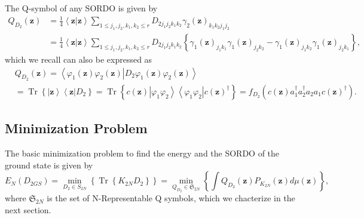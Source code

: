 \documentclass[aps,preprint]{revtex4}%
\begin{document}
The Q-symbol of any SORDO is given by
\begin{align}
Q_{D_{2}}\left(  \mathbf{z}\right)   &  =\frac{1}{4}\left\langle
\mathbf{z}\left\vert \mathbf{z}\right.  \right\rangle \sum_{1\leq j_{1}%
,j_{2},k_{1},k_{2}\leq r}D_{2j_{1}j_{2}k_{1}k_{2}}\gamma_{2}\left(
\mathbf{z}\right)  _{k_{1}k_{2}j_{1}j_{2}}\nonumber\\
&  =\frac{1}{4}\left\langle \mathbf{z}\left\vert \mathbf{z}\right.
\right\rangle \sum_{1\leq j_{1},j_{2},k_{1},k_{2}\leq r}D_{2j_{1}j_{2}%
k_{1}k_{2}}\left\{  \gamma_{1}\left(  \mathbf{z}\right)  _{j_{1}k_{1}}%
\gamma_{1}\left(  \mathbf{z}\right)  _{j_{2}k_{2}}-\gamma_{1}\left(
\mathbf{z}\right)  _{j_{1}k_{2}}\gamma_{1}\left(  \mathbf{z}\right)
_{j_{2}k_{1}}\right\}  ,
\end{align}
which we recall can also be expressed as
\begin{align}
&  Q_{D_{2}}\left(  \mathbf{z}\right)  =\left\langle \varphi_{1}\left(
\mathbf{z}\right)  \varphi_{2}\left(  \mathbf{z}\right)  \left\vert
D_{2}\varphi_{1}\left(  \mathbf{z}\right)  \varphi_{2}\left(  \mathbf{z}%
\right)  \right.  \right\rangle \nonumber\\
&  =\operatorname*{Tr}\left\{  \left\vert \mathbf{z}\right\rangle \left\langle
\mathbf{z}\right\vert D_{2}\right\}  =\operatorname*{Tr}\left\{  c\left(
\mathbf{z}\right)  \left\vert \varphi_{1}\varphi_{2}\right\rangle \left\langle
\varphi_{1}\varphi_{2}\right\vert c\left(  \mathbf{z}\right)  ^{\dagger
}\right\}  =f_{D_{2}}\left(  c\left(  \mathbf{z}\right)  a_{1}^{\dagger}%
a_{2}^{\dagger}a_{2}a_{1}c\left(  \mathbf{z}\right)  ^{\dagger}\right)  .
\end{align}


\subsection{Minimization Problem}

The basic minimization problem to find the energy and the SORDO of the ground
state is given by
\begin{equation}
E_{N}\left(  D_{2GS}\right)  =\min_{D_{2}\in S_{2N}}\left\{
\operatorname*{Tr}\left\{  K_{2N}D_{2}\right\}  \right\}  =\min_{Q_{D_{2}}%
\in\mathfrak{S}_{2N}}\left\{  \int Q_{D_{2}}\left(  \mathbf{z}\right)
P_{K_{2N}}\left(  \mathbf{z}\right)  d\mu\left(  \mathbf{z}\right)  \right\}
,
\end{equation}
where $\mathfrak{S}_{2N}$ is the set of N-Representable Q symbols, which we
chacterize in the next section.
\end{document}
